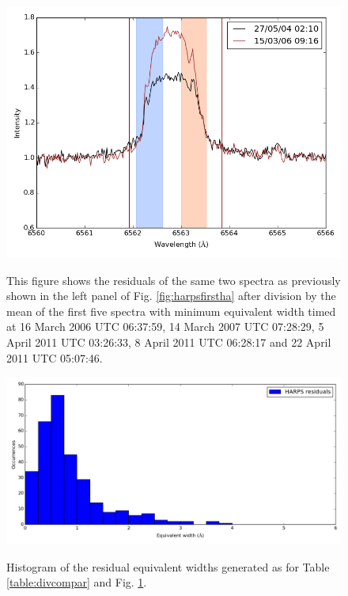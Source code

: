 \begin{figure}[!htbp]
\begin{center}
\includegraphics[scale=0.4]{Figures/harpsfirsthad5.png} \\
\end{center}   
\caption{This figure shows the residuals of the same two spectra as previously shown in the left panel of
 Fig. \ref{fig:harpsfirstha} after division by the mean of the first five spectra with minimum equivalent width
timed at 16 March 2006 UTC 06:37:59, 14 March 2007 UTC 07:28:29, 5 April 2011 UTC 03:26:33, 8 April 2011 UTC 06:28:17
and 22 April 2011 UTC 05:07:46.}
\protect\label{fig:harpsfirsthad5}
\end{figure}

\begin{figure}[!htbp]
\begin{center}
\includegraphics[scale=0.4]{Figures/residhists.png} \\
\end{center}   
\caption{Histogram of the residual equivalent widths generated as for Table \ref{table:divcompar} and Fig. \ref{fig:harpsfirsthad5}.}
\protect\label{fig:residhists}
\end{figure}
\clearpage


